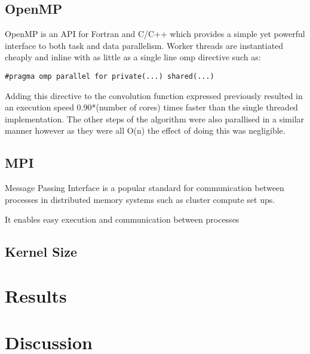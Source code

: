 \documentclass{article}
\begin{document}
\subsection{OpenMP}
OpenMP is an API for Fortran and C/C++ which provides a simple yet powerful
interface to both task and data parallelism. Worker threads are instantiated
cheaply and inline with as little as a single line omp directive such as:
\begin{verbatim}
#pragma omp parallel for private(...) shared(...)
\end{verbatim}

Adding this directive to the convolution function expressed previously resulted
in an execution speed 0.90*(number of cores) times faster than the single
threaded implementation. The other steps of the algorithm were also parallised
in a similar manner however as they were all O(n) the effect of doing this was
negligible.

\subsection{MPI}
Message Passing Interface is a popular standard for communication between
processes in distributed memory systems such as cluster compute set ups.

It enables easy execution and communication between processes

\subsection{Kernel Size}

\section{Results}

\section{Discussion}
\end{document}
